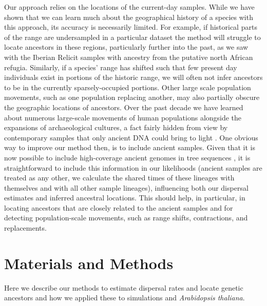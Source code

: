 \documentclass[12pt]{article}
\begin{document}
Our approach relies on the locations of the current-day samples. 
While we have shown that we can learn much about the geographical history of a species with this approach, its accuracy is necessarily limited. 
For example, if historical parts of the range are undersampled in a particular dataset the method will struggle to locate ancestors in these regions, particularly further into the past, as we saw with the Iberian Relicit samples with ancestry from the putative north African refugia.
Similarly, if a species' range has shifted such that few present day individuals exist in portions of the historic range, we will often not infer ancestors to be in the currently sparsely-occupied portions. 
Other large scale population movements, such as one population replacing another, may also partially obscure the geographic locations of ancestors. 
Over the past decade we have learned about numerous large-scale movements of human populations alongside the expansions of archaeological cultures, a fact fairly hidden from view by contemporary samples that only ancient DNA could bring to light \citep{slatkin2016ancient,reich2018we}.
One obvious way to improve our method then, is to include ancient samples. 
Given that it is now possible to include high-coverage ancient genomes in tree sequences \citep{speidel2021inferring,wohns2021unified}, it is straightforward to include this information in our likelihoods (ancient samples are treated as any other, we calculate the shared times of these lineages with themselves and with all other sample lineages), influencing both our dispersal estimates and inferred ancestral locations.
This should help, in particular, in locating ancestors that are closely related to the ancient samples and for detecting population-scale movements, such as range shifts, contractions, and replacements.

\section*{Materials and Methods}
\label{sec:methods}

Here we describe our methods to estimate dispersal rates and locate genetic ancestors and how we applied these to simulations and \textit{Arabidopsis thaliana}.

\end{document}
